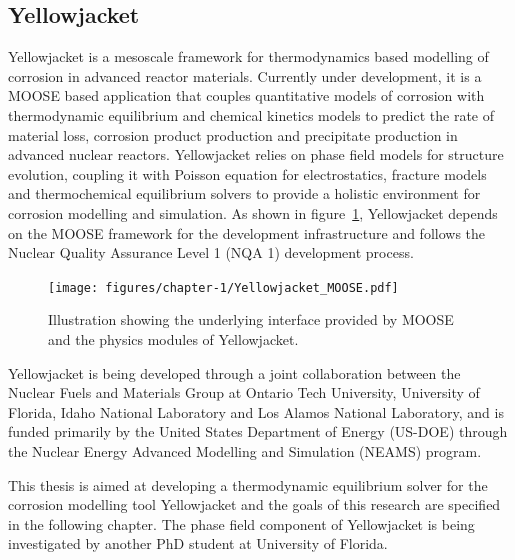 	\subsection{Yellowjacket}
	{Yellowjacket} is a mesoscale framework for thermodynamics based modelling of corrosion in advanced reactor materials. Currently under development, it is a {MOOSE} based application that couples quantitative models of corrosion with thermodynamic equilibrium and chemical kinetics models to predict the rate of material loss, corrosion product production and precipitate production in advanced nuclear reactors. {Yellowjacket} relies on phase field models for structure evolution, coupling it with Poisson equation for electrostatics, fracture models and thermochemical equilibrium solvers to provide a holistic environment for corrosion modelling and simulation. As shown in figure~\ref{fig:yjmoose}, {Yellowjacket} depends on the {MOOSE} framework for the development infrastructure and follows the Nuclear Quality Assurance Level 1 (NQA 1) \cite{NQA-web-page} development process.

	\begin{figure}[htbp]
		\centering
		\texttt{[image: figures/chapter-1/Yellowjacket\_MOOSE.pdf]}
		\caption{Illustration showing the underlying interface provided by {MOOSE} and the physics modules of {Yellowjacket}.}
		\label{fig:yjmoose}
	\end{figure}

	{Yellowjacket} is being developed through a joint collaboration between the Nuclear Fuels and Materials Group at Ontario Tech University, University of Florida, Idaho National Laboratory and Los Alamos National Laboratory, and is funded primarily by the United States Department of Energy (US-DOE) through the Nuclear Energy Advanced Modelling and Simulation (NEAMS) program.

	This thesis is aimed at developing a thermodynamic equilibrium solver for the corrosion modelling tool {Yellowjacket} and the goals of this research are specified in the following chapter. The phase field component of {Yellowjacket} is being investigated by another PhD student at University of Florida.
